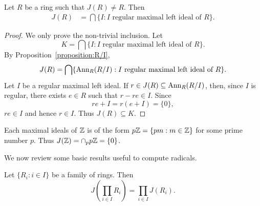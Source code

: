 %

\begin{theorem}
	\label{thm:J(R)}
	Let $R$ be a ring such that $J(R)\ne R$. Then 
	\begin{align*}
		J(R)&=\bigcap\{I:\text{$I$ regular maximal left ideal of $R$}\}.
	\end{align*}
\end{theorem}

\begin{proof}
    We only prove the non-trivial inclusion. 
	Let 
	\[
	K=\bigcap\{I:\text{$I$ regular maximal left ideal of $R$}\}.
	\]
	By
	Proposition~\ref{proposition:R/I}, 
	\[
		J(R)=\bigcap\{\operatorname{Ann}_R(R/I):I\text{ regular maximal left ideal of $R$}\}.
	\]
	Let $I$ be a regular maximal left ideal. If $r\in J(R)\subseteq
	\operatorname{Ann}_R(R/I)$, then, since $I$ is regular, there exists $e\in R$ such that
	$r-re\in I$. Since 
	\[
	re+I=r(e+I)=\{0\},
	\]
	$re\in I$ and hence $r\in I$. Thus $J(R)\subseteq K$. 
\end{proof}

\begin{example}
	Each maximal ideals of $\mathbb{Z}$ is of the form $p\mathbb{Z}=\{pm:m\in\mathbb{Z}\}$ for some prime number $p$. 
	Thus $J(\mathbb{Z})=\cap_p p\mathbb{Z}=\{0\}$.
\end{example}




We now review some basic results useful to compute radicals. 

\begin{proposition}
	Let $\{R_i:i\in I\}$ be a family of rings. Then 
	\[
	J\left(\prod_{i\in I}R_i\right)=\prod_{i\in I}J(R_i).
	\]
\end{proposition}

